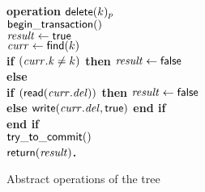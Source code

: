 \begin{figure}[h!]
{{\begin{minipage}[t]{150mm}
\begin{tabbing}
\bf{operation} $\act{delete}(k)_p$ \\
		 \> $\lit{begin\_transaction}()$ \\
		 \> $\ms{result} \gets \lit{true}$ \\
		 \> $\ms{curr} \gets \lit{find}(k)$ \\%
		 \> \bf{if} $(\ms{curr.k} \neq k)$ \bf{then} $\ms{result} \gets \lit{false}$\\%
		 \>\> \bf{else} \\
		 \>\>\> \bf{if} $(\lit{read}(\ms{curr.del}))$ \bf{then} $\ms{result} \gets \lit{false}$ \\%
		 \>\>\>\> \bf{else} $\lit{write}(\ms{curr.del}, \lit{true})$ {\bf end if} \\%
		 \> \bf{end if} \\
		 \> $\lit{try\_to\_commit}()$ \\
		 \> $\sf{return}(\ms{result})$. \\%

\end{tabbing}
\normalsize
\end{minipage}
}
\caption{Abstract operations of the tree}
\label{fig:tree-abstract}
}
\end{figure}
   		
   		
   		
